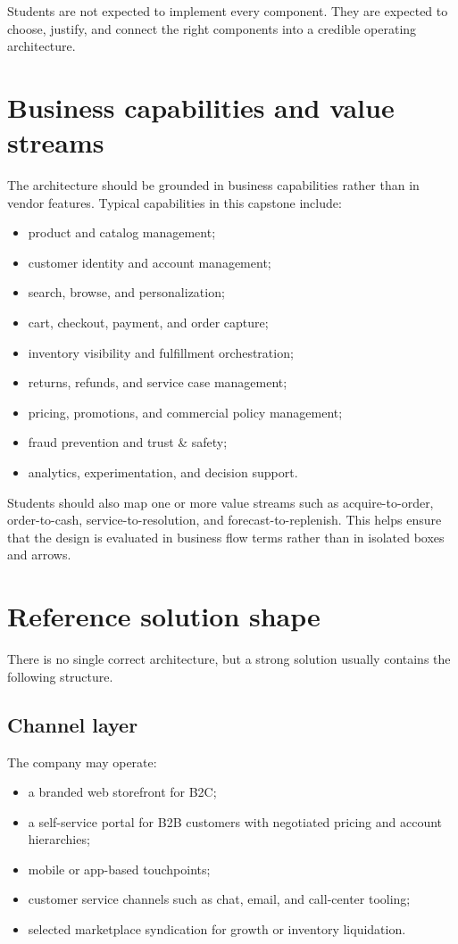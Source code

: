 Students are not expected to implement every component. They are expected to choose, justify, and connect the right components into a credible operating architecture.

\section{Business capabilities and value streams}
The architecture should be grounded in business capabilities rather than in vendor features. Typical capabilities in this capstone include:
\begin{itemize}
  \item product and catalog management;
  \item customer identity and account management;
  \item search, browse, and personalization;
  \item cart, checkout, payment, and order capture;
  \item inventory visibility and fulfillment orchestration;
  \item returns, refunds, and service case management;
  \item pricing, promotions, and commercial policy management;
  \item fraud prevention and trust \& safety;
  \item analytics, experimentation, and decision support.
\end{itemize}

Students should also map one or more value streams such as acquire-to-order, order-to-cash, service-to-resolution, and forecast-to-replenish. This helps ensure that the design is evaluated in business flow terms rather than in isolated boxes and arrows.

\section{Reference solution shape}
There is no single correct architecture, but a strong solution usually contains the following structure.

\subsection{Channel layer}
The company may operate:
\begin{itemize}
  \item a branded web storefront for B2C;
  \item a self-service portal for B2B customers with negotiated pricing and account hierarchies;
  \item mobile or app-based touchpoints;
  \item customer service channels such as chat, email, and call-center tooling;
  \item selected marketplace syndication for growth or inventory liquidation.
\end{itemize}


